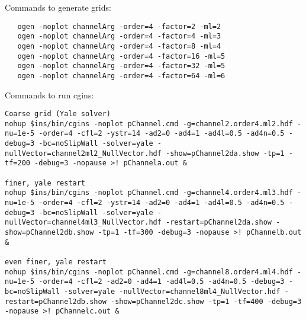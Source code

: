 \documentclass[11pt]{article}
\begin{document}
Commands to generate grids:
\begin{verbatim}
   ogen -noplot channelArg -order=4 -factor=2 -ml=2
   ogen -noplot channelArg -order=4 -factor=4 -ml=3
   ogen -noplot channelArg -order=4 -factor=8 -ml=4
   ogen -noplot channelArg -order=4 -factor=16 -ml=5
   ogen -noplot channelArg -order=4 -factor=32 -ml=5
   ogen -noplot channelArg -order=4 -factor=64 -ml=6
\end{verbatim}

Commands to run cgins:
\begin{verbatim}
Coarse grid (Yale solver)
nohup $ins/bin/cgins -noplot pChannel.cmd -g=channel2.order4.ml2.hdf -nu=1e-5 -order=4 -cfl=2 -ystr=14 -ad2=0 -ad4=1 -ad4l=0.5 -ad4n=0.5 -debug=3 -bc=noSlipWall -solver=yale -nullVector=channel2ml2_NullVector.hdf -show=pChannel2da.show -tp=1 -tf=200 -debug=3 -nopause >! pChannela.out &

finer, yale restart 
nohup $ins/bin/cgins -noplot pChannel.cmd -g=channel4.order4.ml3.hdf -nu=1e-5 -order=4 -cfl=2 -ystr=14 -ad2=0 -ad4=1 -ad4l=0.5 -ad4n=0.5 -debug=3 -bc=noSlipWall -solver=yale -nullVector=channel4ml3_NullVector.hdf -restart=pChannel2da.show -show=pChannel2db.show -tp=1 -tf=300 -debug=3 -nopause >! pChannelb.out &

even finer, yale restart 
nohup $ins/bin/cgins -noplot pChannel.cmd -g=channel8.order4.ml4.hdf -nu=1e-5 -order=4 -cfl=2 -ad2=0 -ad4=1 -ad4l=0.5 -ad4n=0.5 -debug=3 -bc=noSlipWall -solver=yale -nullVector=channel8ml4_NullVector.hdf -restart=pChannel2db.show -show=pChannel2dc.show -tp=1 -tf=400 -debug=3 -nopause >! pChannelc.out &

\end{verbatim}


%
%


\printindex
\end{document}
